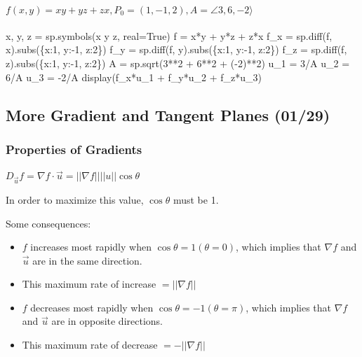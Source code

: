 \documentclass[
  letterpaper,
  DIV=11,
  numbers=noendperiod]{scrartcl}
\let\oldparagraph\paragraph
\renewcommand{\paragraph}[1]{\oldparagraph{#1}\mbox{}}
\newenvironment{Shaded}{\begin{snugshade}}{\end{snugshade}}
\newcommand{\NormalTok}[1]{\textcolor[rgb]{0.00,0.23,0.31}{#1}}
\providecommand{\tightlist}{%
  \setlength{\itemsep}{0pt}\setlength{\parskip}{0pt}}\usepackage{longtable,booktabs,array}
\begin{document}
\paragraph{\texorpdfstring{\(f(x, y) = xy + yz + zx, P_0 = (1, -1, 2), A = \angle 3, 6, -2 \rangle\)}{f(x, y) = xy + yz + zx, P\_0 = (1, -1, 2), A = \textbackslash angle 3, 6, -2 \textbackslash rangle}}\label{fx-y-xy-yz-zx-p_0-1--1-2-a-angle-3-6--2-rangle}

\begin{Shaded}
\begin{Highlighting}[numbers=left,,]
\NormalTok{x, y, z = sp.symbols(\textquotesingle{}x y z\textquotesingle{}, real=True)}
\NormalTok{f = x*y + y*z + z*x}
\NormalTok{f\_x = sp.diff(f, x).subs(\{x:1, y:{-}1, z:2\})}
\NormalTok{f\_y = sp.diff(f, y).subs(\{x:1, y:{-}1, z:2\})}
\NormalTok{f\_z = sp.diff(f, z).subs(\{x:1, y:{-}1, z:2\})}
\NormalTok{A = sp.sqrt(3**2 + 6**2 + ({-}2)**2)}
\NormalTok{u\_1 = 3/A}
\NormalTok{u\_2 = 6/A}
\NormalTok{u\_3 = {-}2/A}
\NormalTok{display(f\_x*u\_1 + f\_y*u\_2 + f\_z*u\_3)}
\end{Highlighting}
\end{Shaded}

\subsection{More Gradient and Tangent Planes
(01/29)}\label{more-gradient-and-tangent-planes-0129}

\subsubsection{Properties of Gradients}\label{properties-of-gradients}

\(D_{\vec{u}}f = \nabla f \cdot \vec{u} = ||\nabla f||||u||\cos\theta\)

In order to maximize this value, \(\cos\theta\) must be 1.

Some consequences:

\begin{itemize}
\tightlist
\item
  \(f\) increases most rapidly when \(\cos\theta = 1 (\theta = 0)\),
  which implies that \(\nabla f\) and \(\vec{u}\) are in the same
  direction.
\item
  This maximum rate of increase \(= ||\nabla f||\)
\item
  \(f\) decreases most rapidly when \(\cos\theta = -1 (\theta = \pi)\),
  which implies that \(\nabla f\) and \(\vec{u}\) are in opposite
  directions.
\item
  This maximum rate of decrease \(= -||\nabla f||\)
\end{itemize}
\end{document}
